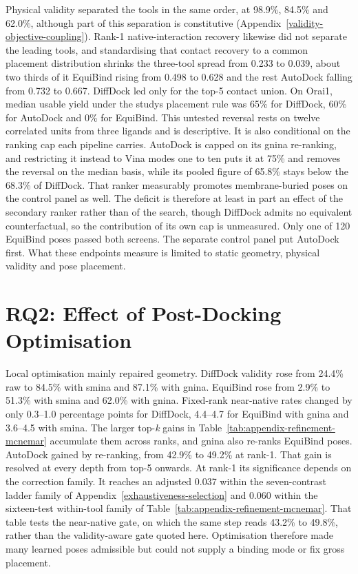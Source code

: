 Physical validity separated the tools in the same order, at 98.9\%, 84.5\% and 62.0\%, although part of this separation is constitutive (Appendix~\ref{validity-objective-coupling}). Rank-1 native-interaction recovery likewise did not separate the leading tools, and standardising that contact recovery to a common placement distribution shrinks the three-tool spread from 0.233 to 0.039, about two thirds of it EquiBind rising from 0.498 to 0.628 and the rest AutoDock falling from 0.732 to 0.667. DiffDock led only for the top-5 contact union. On Orai1, median usable yield under the study\textquotesingle s placement rule was 65\% for DiffDock, 60\% for AutoDock and 0\% for EquiBind. This untested reversal rests on twelve correlated units from three ligands and is descriptive. It is also conditional on the ranking cap each pipeline carries. AutoDock is capped on its gnina re-ranking, and restricting it instead to Vina modes one to ten puts it at 75\% and removes the reversal on the median basis, while its pooled figure of 65.8\% stays below the 68.3\% of DiffDock. That ranker measurably promotes membrane-buried poses on the control panel as well. The deficit is therefore at least in part an effect of the secondary ranker rather than of the search, though DiffDock admits no equivalent counterfactual, so the contribution of its own cap is unmeasured. Only one of 120 EquiBind poses passed both screens. The separate control panel put AutoDock first. What these endpoints measure is limited to static geometry, physical validity and pose placement.

\hypertarget{rq2-effect-of-post-docking-optimisation}{%
\section{RQ2: Effect of Post-Docking Optimisation}\label{rq2-effect-of-post-docking-optimisation}}

Local optimisation mainly repaired geometry. DiffDock validity rose from 24.4\% raw to 84.5\% with smina and 87.1\% with gnina. EquiBind rose from 2.9\% to 51.3\% with smina and 62.0\% with gnina. Fixed-rank near-native rates changed by only 0.3--1.0 percentage points for DiffDock, 4.4--4.7 for EquiBind with gnina and 3.6--4.5 with smina. The larger top-\emph{k} gains in Table~\ref{tab:appendix-refinement-mcnemar} accumulate them across ranks, and gnina also re-ranks EquiBind poses. AutoDock gained by re-ranking, from 42.9\% to 49.2\% at rank-1. That gain is resolved at every depth from top-5 onwards. At rank-1 its significance depends on the correction family. It reaches an adjusted 0.037 within the seven-contrast ladder family of Appendix~\ref{exhaustiveness-selection} and 0.060 within the sixteen-test within-tool family of Table~\ref{tab:appendix-refinement-mcnemar}. That table tests the near-native gate, on which the same step reads 43.2\% to 49.8\%, rather than the validity-aware gate quoted here. Optimisation therefore made many learned poses admissible but could not supply a binding mode or fix gross placement.

